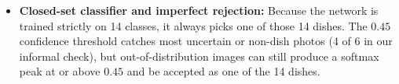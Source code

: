 \begin{itemize}
        ASC122 at $396\text{ kcal}$ per plate, Dal makhani OSR139 at
        $262\text{ kcal}$ per bowl, Spinach paneer ASC215 at $230\text{ kcal}$
        per bowl, and Plain pulao ASC114 at $432\text{ kcal}$ per plate). We did
        not adopt INDB's cooked-dish totals directly because INDB counts all
        frying oil in a recipe as consumed and does not apply cooking yield
        factors; we used INDB only to source UK CoFID~\cite{cofid2021}
        ingredient values and as a sanity cross-check.
  \item \textbf{Closed-set classifier and imperfect rejection:} Because the
        network is trained strictly on 14 classes, it always picks one of those
        14 dishes. The $0.45$ confidence threshold catches most uncertain or
        non-dish photos (4 of 6 in our informal check), but out-of-distribution
        images can still produce a softmax peak at or above $0.45$ and be
        accepted as one of the 14 dishes.
\end{itemize}

